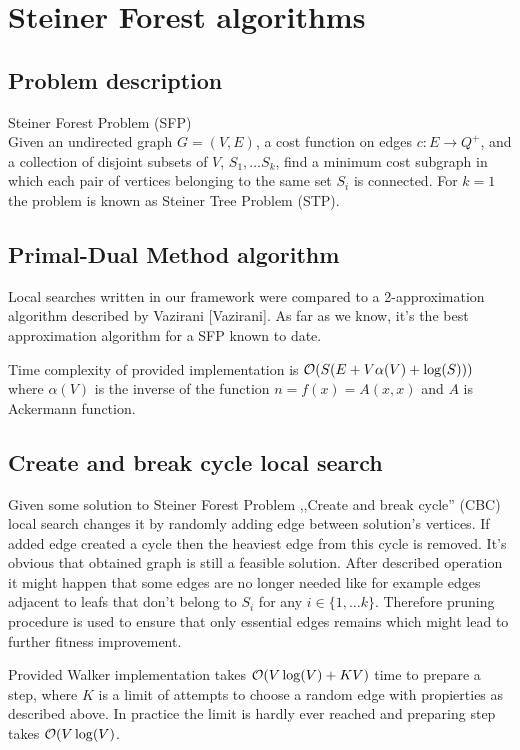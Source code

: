 \chapter{Steiner Forest algorithms}

\section{Problem description}
Steiner Forest Problem (SFP)\\
Given an undirected graph $G = (V, E)$, a cost function on edges $c : E \rightarrow Q^+$, and a collection of disjoint subsets of $V$, $S_1, \dots S_k$, find a minimum cost subgraph in which each pair of vertices belonging to the same set $S_i$ is connected.
For $k = 1$ the problem is known as Steiner Tree Problem (STP).

\section{Primal-Dual Method algorithm}
Local searches written in our framework were compared to a 2-approximation algorithm described by Vazirani [Vazirani]. As far as we know, it's the best approximation algorithm for a SFP known to date.

Time complexity of provided implementation is $\mathcal{O}(S(E + V\alpha(V) + \log(S)))$ where $\alpha(V)$ is the inverse of the function $n = f(x) = A(x, x)$ and $A$ is Ackermann function.

\section{Create and break cycle local search}
Given some solution to Steiner Forest Problem ,,Create and break cycle'' (CBC) local search changes it by randomly adding edge between solution's vertices. If added edge created a cycle then the heaviest edge from this cycle is removed. It's obvious that obtained graph is still a feasible solution. After described operation it might happen that some edges are no longer needed like for example edges adjacent to leafs that don't belong to $S_i$ for any $i \in \{1, \dots k\}$. Therefore pruning procedure is used to ensure that only essential edges remains which might lead to further fitness improvement.

Provided Walker implementation takes $\mathcal{O}(V\log(V) + KV)$ time to prepare a step, where $K$ is a limit of attempts to choose a random edge with propierties as described above. In practice the limit is hardly ever reached and preparing step takes $\mathcal{O}(V\log(V)$.

